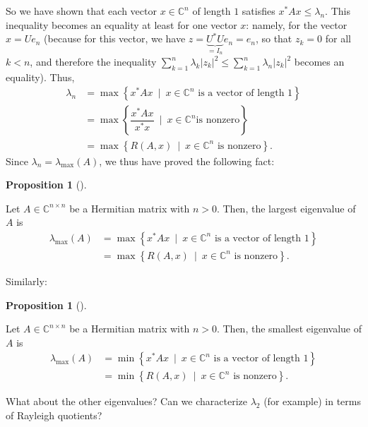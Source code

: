 \documentclass[numbers=enddot,12pt,final,onecolumn,notitlepage]{scrartcl}%
\numberwithin{exer}{subsection}
\theoremstyle{definition}
\newtheorem{prop}[theo]{Proposition}
\newenvironment{proposition}[1][]
{\begin{prop}[#1]\begin{leftbar}}
{\end{leftbar}\end{prop}}
\let\sumnonlimits\sum
\renewcommand{\sum}{\sumnonlimits\limits}
\begin{document}
So we have shown that each vector $x\in\mathbb{C}^{n}$ of length $1$ satisfies
$x^{\ast}Ax\leq\lambda_{n}$. This inequality becomes an equality at least for
one vector $x$: namely, for the vector $x=Ue_{n}$ (because for this vector, we
have $z=\underbrace{U^{\ast}U}_{=I_{n}}e_{n}=e_{n}$, so that $z_{k}=0$ for all
$k<n$, and therefore the inequality $\sum_{k=1}^{n}\lambda_{k}\left\vert
z_{k}\right\vert ^{2}\leq\sum_{k=1}^{n}\lambda_{n}\left\vert z_{k}\right\vert
^{2}$ becomes an equality). Thus,%
\begin{align*}
\lambda_{n}  & =\max\left\{  x^{\ast}Ax\ \mid\ x\in\mathbb{C}^{n}\text{ is a
vector of length }1\right\}  \\
& =\max\left\{  \dfrac{x^{\ast}Ax}{x^{\ast}x}\ \mid\ x\in\mathbb{C}^{n}\text{
is nonzero}\right\}  \\
& =\max\left\{  R\left(  A,x\right)  \ \mid\ x\in\mathbb{C}^{n}\text{ is
nonzero}\right\}  .
\end{align*}
Since $\lambda_{n}=\lambda_{\max}\left(  A\right)  $, we thus have proved the
following fact:

\begin{proposition}
Let $A\in\mathbb{C}^{n\times n}$ be a Hermitian matrix with $n>0$. Then, the
largest eigenvalue of $A$ is%
\begin{align*}
\lambda_{\max}\left(  A\right)    & =\max\left\{  x^{\ast}Ax\ \mid
\ x\in\mathbb{C}^{n}\text{ is a vector of length }1\right\}  \\
& =\max\left\{  R\left(  A,x\right)  \ \mid\ x\in\mathbb{C}^{n}\text{ is
nonzero}\right\}  .
\end{align*}

\end{proposition}

Similarly:

\begin{proposition}
Let $A\in\mathbb{C}^{n\times n}$ be a Hermitian matrix with $n>0$. Then, the
smallest eigenvalue of $A$ is%
\begin{align*}
\lambda_{\max}\left(  A\right)    & =\min\left\{  x^{\ast}Ax\ \mid
\ x\in\mathbb{C}^{n}\text{ is a vector of length }1\right\}  \\
& =\min\left\{  R\left(  A,x\right)  \ \mid\ x\in\mathbb{C}^{n}\text{ is
nonzero}\right\}  .
\end{align*}

\end{proposition}

What about the other eigenvalues? Can we characterize $\lambda_{2}$ (for
example) in terms of Rayleigh quotients?
\end{document}
